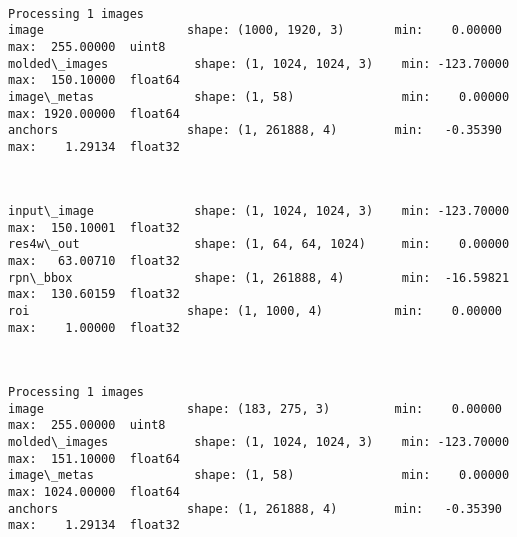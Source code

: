 \documentclass[11pt]{article}
\begin{document}
    \begin{center}
    \end{center}
    { \hspace*{\fill} \\}
    
    \begin{Verbatim}[commandchars=\\\{\}]
Processing 1 images
image                    shape: (1000, 1920, 3)       min:    0.00000  max:  255.00000  uint8
molded\_images            shape: (1, 1024, 1024, 3)    min: -123.70000  max:  150.10000  float64
image\_metas              shape: (1, 58)               min:    0.00000  max: 1920.00000  float64
anchors                  shape: (1, 261888, 4)        min:   -0.35390  max:    1.29134  float32

    \end{Verbatim}

    \begin{center}
    \end{center}
    { \hspace*{\fill} \\}
    
    \begin{Verbatim}[commandchars=\\\{\}]
input\_image              shape: (1, 1024, 1024, 3)    min: -123.70000  max:  150.10001  float32
res4w\_out                shape: (1, 64, 64, 1024)     min:    0.00000  max:   63.00710  float32
rpn\_bbox                 shape: (1, 261888, 4)        min:  -16.59821  max:  130.60159  float32
roi                      shape: (1, 1000, 4)          min:    0.00000  max:    1.00000  float32

    \end{Verbatim}

    \begin{center}
    \end{center}
    { \hspace*{\fill} \\}
    
    \begin{Verbatim}[commandchars=\\\{\}]
Processing 1 images
image                    shape: (183, 275, 3)         min:    0.00000  max:  255.00000  uint8
molded\_images            shape: (1, 1024, 1024, 3)    min: -123.70000  max:  151.10000  float64
image\_metas              shape: (1, 58)               min:    0.00000  max: 1024.00000  float64
anchors                  shape: (1, 261888, 4)        min:   -0.35390  max:    1.29134  float32

    \end{Verbatim}
\end{document}
